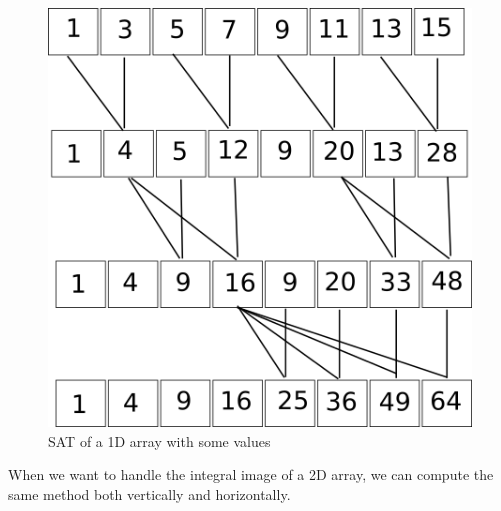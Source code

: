    	  	\begin{figure}[h]
   	  		\centering
   	  		\includegraphics[width=\textwidth]{imm/iia/iia1.png}  
   	  		\caption{SAT of a 1D array with some values}
   	  		\label{fig:iia1}
   	  	\end{figure}
  When we want to handle the integral image of a 2D array, we can compute the same method both vertically and horizontally. 	  	
   	  	\clearpage
